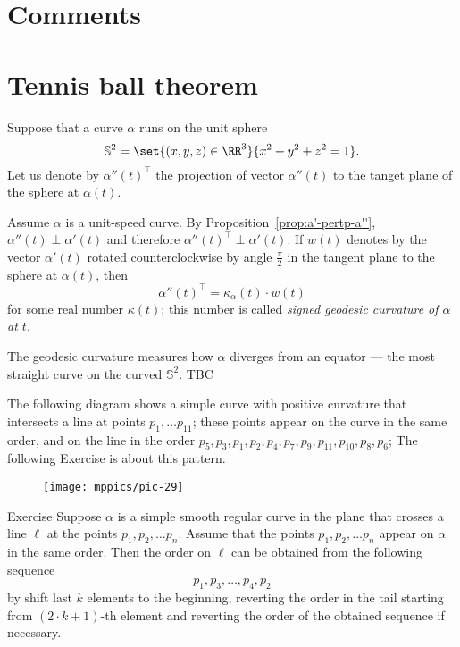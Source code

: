\section{Comments}


\section{Tennis ball theorem}

Suppose that a curve $\alpha$ runs on the unit sphere 
\[\mathbb{S}^2=\set{(x,y,z)\in\RR^3}{x^2+y^2+z^2=1}.\] 
Let us denote by $\alpha''(t)^\top$ the projection of vector $\alpha''(t)$ to the tanget plane of the sphere at $\alpha(t)$.

Assume $\alpha$ is a unit-speed curve.
By Proposition~\ref{prop:a'-pertp-a''}, $\alpha''(t)\perp\alpha'(t)$ and therefore $\alpha''(t)^\top\perp\alpha'(t)$.
If $w(t)$ denotes by the vector $\alpha'(t)$ rotated
counterclockwise by angle $\tfrac\pi2$ in the tangent plane to the sphere at $\alpha(t)$, then 
\[\alpha''(t)^\top=\kappa_\alpha(t)\cdot w(t)\]
for some real number $\kappa(t)$;
this number is called \emph{signed geodesic curvature of $\alpha$ at $t$}.

The geodesic curvature measures how $\alpha$ diverges from an equator --- the most straight curve on the curved $\mathbb{S}^2$.
TBC














The following diagram shows a simple curve with positive curvature that intersects a line at points $p_1,\dots p_11$; these points appear on the curve in the same order, and on the line  in the order $p_5,p_3,p_1,p_2,p_4,p_7,p_9,p_{11},p_{10},p_8,p_6$; 
The following Exercise is about this pattern.

\begin{figure}[h!]
\vskip-0mm
\centering
\texttt{[image: mppics/pic-29]}
\vskip0mm
\end{figure}

\begin{thm}{Exercise}
Suppose $\alpha$ is a simple smooth regular curve in the plane that crosses a line $\ell$ at the points $p_1,p_2,\dots p_n$.
Assume that the points $p_1,p_2,\dots p_n$ appear on $\alpha$ in the same order.
Then the order on $\ell$ can be obtained from the following sequence 
\[p_1,p_3,\dots,p_4 ,p_2\]
by shift last $k$ elements to the beginning, reverting the order in the tail starting from $(2\cdot k+1)$-th element and reverting the order of the obtained sequence if necessary.
\end{thm}





